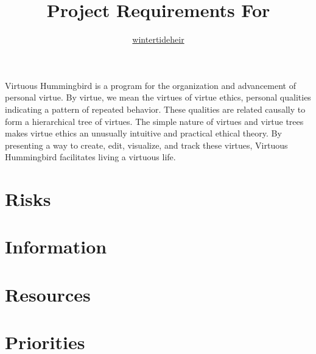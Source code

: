\documentclass{article}
\title{Project Requirements For \name{}}
\author{\href{https://github.com/wintertideheir}{wintertideheir}}
\newcommand{\name}{Virtuous Hummingbird}
\begin{document}
\maketitle

\name{} is a program for the organization and advancement of personal virtue.
By virtue, we mean the virtues of virtue ethics, personal qualities indicating a pattern of repeated behavior.
These qualities are related causally to form a hierarchical tree of virtues. 
The simple nature of virtues and virtue trees makes virtue ethics an unusually intuitive and practical ethical theory.
By presenting a way to create, edit, visualize, and track these virtues, \name{} facilitates living a virtuous life.

\tableofcontents

\section{Risks}


\section{Information}


\section{Resources}


\section{Priorities}

\end{document}
